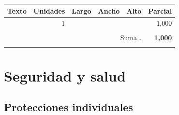 \documentclass{book}%
\begin{document}
\begin{longtable}{lrrrrr}
Texto&Unidades&Largo&Ancho&Alto&Parcial\\%
\hline%
\multicolumn{1}{p{3.5cm}}{ }&1&&&&     1,000\\%
&&&&&\\%
\multicolumn{5}{r}{Suma\ldots}&\textbf{     1,000}\\%
\hline%
&&&&&\\%
\end{longtable}%
\newpage

%
\section{Seguridad y salud}%
\subsection{Protecciones individuales}%
\end{document}
